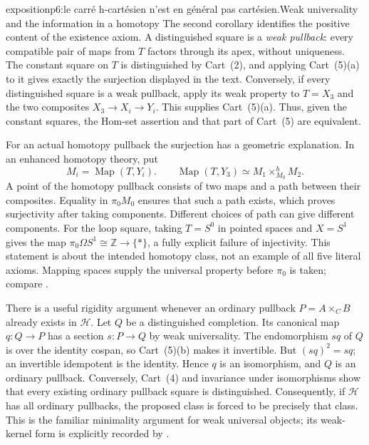\begin{dcomment}{exposition}{p6:le carré h-cartésien n'est en général pas cartésien.}{Weak universality and the information in a homotopy}
The second corollary identifies the positive content of the existence axiom. A distinguished square is a \emph{weak pullback}: every compatible pair of maps from $T$ factors through its apex, without uniqueness. The constant square on $T$ is distinguished by Cart~(2), and applying Cart~(5)(a) to it gives exactly the surjection displayed in the text. Conversely, if every distinguished square is a weak pullback, apply its weak property to $T=X_3$ and the two composites $X_3\to X_i\to Y_i$. This supplies Cart~(5)(a). Thus, given the constant squares, the Hom-set assertion and that part of Cart~(5) are equivalent.

For an actual homotopy pullback the surjection has a geometric explanation. In an enhanced homotopy theory, put
\[
 M_i=\operatorname{Map}(T,Y_i).
 \qquad
 \operatorname{Map}(T,Y_3)\simeq M_1\mathbin{\times^h_{M_0}}M_2.
\]
A point of the homotopy pullback consists of two maps and a path between their composites. Equality in $\pi_0M_0$ ensures that such a path exists, which proves surjectivity after taking components. Different choices of path can give different components. For the loop square, taking $T=S^0$ in pointed spaces and $X=S^1$ gives the map $\pi_0\Omega S^1\cong\mathbb Z\to\{*\}$, a fully explicit failure of injectivity. This statement is about the intended homotopy class, not an example of all five literal axioms. Mapping spaces supply the universal property before $\pi_0$ is taken; compare \citet[\S1.2.13]{Lurie2009HTT}.

There is a useful rigidity argument whenever an ordinary pullback $P=A\times_C B$ already exists in $\mathcal H$. Let $Q$ be a distinguished completion. Its canonical map $q:Q\to P$ has a section $s:P\to Q$ by weak universality. The endomorphism $sq$ of $Q$ is over the identity cospan, so Cart~(5)(b) makes it invertible. But $(sq)^2=sq$; an invertible idempotent is the identity. Hence $q$ is an isomorphism, and $Q$ is an ordinary pullback. Conversely, Cart~(4) and invariance under isomorphisms show that every existing ordinary pullback square is distinguished. Consequently, if $\mathcal H$ has all ordinary pullbacks, the proposed class is forced to be precisely that class. This is the familiar minimality argument for weak universal objects; its weak-kernel form is explicitly recorded by \citet[\S1, ``Weak kernels'', p.~6 of the 2014 manuscript]{Krause2016FlatCovers}.
\end{dcomment}

